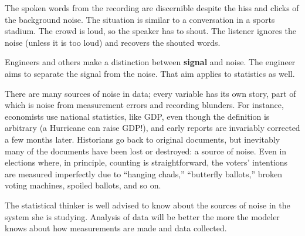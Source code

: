 \documentclass[
  letterpaper,
  DIV=11,
  numbers=noendperiod,
  oneside]{scrreprt}
\begin{document}
{}

The spoken words from the recording are discernible despite the hiss and
clicks of the background noise. The situation is similar to a
conversation in a sports stadium. The crowd is loud, so the speaker has
to shout. The listener ignores the noise (unless it is too loud) and
recovers the shouted words.

Engineers and others make a distinction between \textbf{signal} and
noise. The engineer aims to separate the signal from the noise. That aim
applies to statistics as well.

There are many sources of noise in data; every variable has its own
story, part of which is noise from measurement errors and recording
blunders. For instance, economists use national statistics, like GDP,
even though the definition is arbitrary (a Hurricane can raise GDP!),
and early reports are invariably corrected a few months later.
Historians go back to original documents, but inevitably many of the
documents have been lost or destroyed: a source of noise. Even in
elections where, in principle, counting is straightforward, the voters'
intentions are measured imperfectly due to ``hanging chads,''
``butterfly ballots,'' broken voting machines, spoiled ballots, and so
on.

The statistical thinker is well advised to know about the sources of
noise in the system she is studying. Analysis of data will be better the
more the modeler knows about how measurements are made and data
collected.
\end{document}
